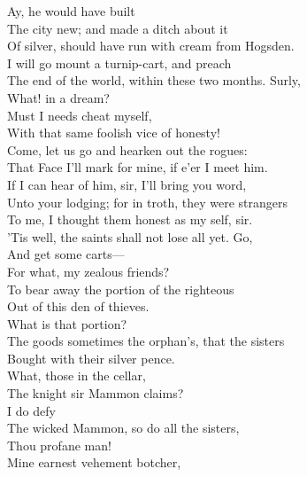 \documentclass[a4paper,oneside,12pt]{memoir}
\begin{document}
\begin{drama*}
\facespeaks {} Ay, he would have built\\
The city new; and made a ditch about it\\
Of silver, should have run with cream from Hogsden.\\
\mammonspeaks I will go mount a turnip-cart, and preach\\
The end of the world, within these two months. Surly,\\
What! in a dream?\\
\surlyspeaks {} Must I needs cheat myself,\\
With that same foolish vice of honesty!\\
Come, let us go and hearken out the rogues:\\
That Face I'll mark for mine, if e'er I meet him.\\
\facespeaks If I can hear of him, sir, I'll bring you word,\\
Unto your lodging; for in troth, they were strangers\\
To me, I thought them honest as my self, sir.\\
\tribulationspeaks 'Tis well, the saints shall not lose all yet. Go,\\
And get some carts---\\
\lovewitspeaks {} For what, my zealous friends?\\
\persecutionspeaks To bear away the portion of the righteous\\
Out of this den of thieves.\\
\lovewitspeaks {} What is that portion?\\
\persecutionspeaks The goods sometimes the orphan's, that the sisters\\
Bought with their silver pence.\\
\lovewitspeaks {} What, those in the cellar,\\
The knight sir Mammon claims?\\
\persecutionspeaks {} I do defy\\
The wicked Mammon, so do all the sisters,\\
Thou profane man!\\
\lovewitspeaks {} Mine earnest vehement botcher,\\

\end{drama*}
\end{document}
